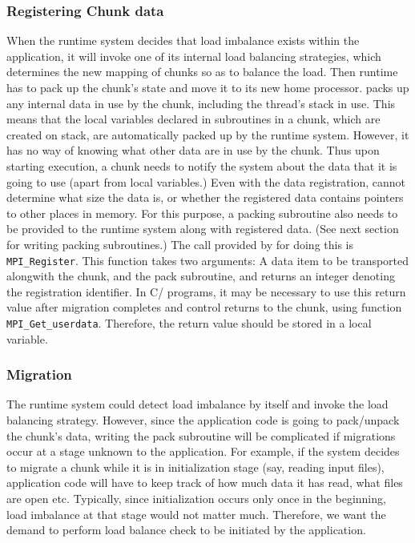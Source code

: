 \documentclass[10pt]{article}
\begin{document}
\subsubsection{Registering Chunk data}

When the \ampi{} runtime system decides that load imbalance exists within the
application, it will invoke one of its internal load balancing strategies,
which determines the new mapping of \ampi{} chunks so as to balance the load.
Then \ampi{} runtime has to pack up the chunk's state and move it to its new
home processor. \ampi{} packs up any internal data in use by the chunk,
including the thread's stack in use. This means that the local variables
declared in subroutines in a chunk, which are created on stack, are
automatically packed up by the \ampi{} runtime system. However, it has no way
of knowing what other data are in use by the chunk. Thus upon starting
execution, a chunk needs to notify the system about the data that it is going
to use (apart from local variables.) Even with the data registration, \ampi{}
cannot determine what size the data is, or whether the registered data contains
pointers to other places in memory. For this purpose, a packing subroutine also
needs to be provided to the \ampi{} runtime system along with registered data.
(See next section for writing packing subroutines.) The call provided by
\ampi{} for doing this is \texttt{MPI\_Register}. This function takes two
arguments: A data item to be transported alongwith the chunk, and the pack
subroutine, and returns an integer denoting the registration identifier. In
C/\CC{} programs, it may be necessary to use this return value after migration
completes and control returns to the chunk, using function
\texttt{MPI\_Get\_userdata}. Therefore, the return value should be stored in a
local variable.

\subsubsection{Migration}

The \ampi{} runtime system could detect load imbalance by itself and invoke the
load balancing strategy. However, since the application code is going to
pack/unpack the chunk's data, writing the pack subroutine will be complicated
if migrations occur at a stage unknown to the application. For example, if the
system decides to migrate a chunk while it is in initialization stage (say,
reading input files), application code will have to keep track of how much data
it has read, what files are open etc. Typically, since initialization occurs
only once in the beginning, load imbalance at that stage would not matter much.
Therefore, we want the demand to perform load balance check to be initiated by
the application.
\end{document}

